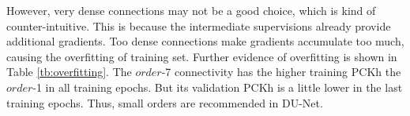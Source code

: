 However, very dense connections may not be a good choice, which is kind of counter-intuitive. This is because the intermediate supervisions already provide additional gradients. Too dense connections make gradients accumulate too much, causing the overfitting of training set. Further evidence of overfitting is shown in Table \ref{tb:overfitting}. The $order$-7 connectivity has the higher training PCKh the $order$-1 in all training epochs. But its validation PCKh is a little lower in the last training epochs. Thus, small orders are recommended in DU-Net.


